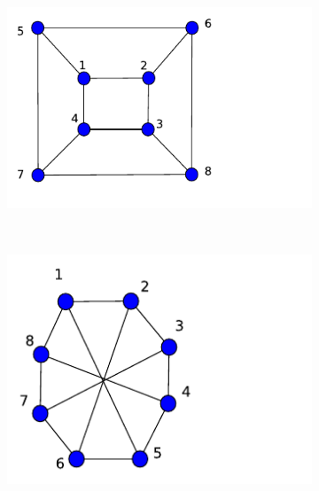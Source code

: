 \documentclass[10pt,a4paper]{article}
\theoremstyle{plain}
\theoremstyle{definition}
\begin{document}
        \begin{figure}[H]
        	\centering
        	\begin{subfigure}[b]{0.30\textwidth}
        		\includegraphics[width= \textwidth]{images/traceisomorphism2.pdf}
        		\caption{}
        		\label{isotracegraph1}
        	\end{subfigure}~
        	\begin{subfigure}[b]{0.30\textwidth}
        		\includegraphics[width= \textwidth]{images/traceisomorphism3.pdf}
        		\caption{}
        		\label{isotracegraph2}
        	\end{subfigure}~
        	\begin{subfigure}[b]{0.35\textwidth}

\end{subfigure}
\end{figure}
\end{document}
